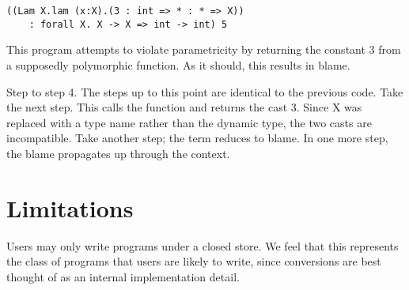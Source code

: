 \documentclass[11pt,numbers,nocopyrightspace,acmlarge,anonymous]{acmart}
\begin{document}
\begin{lstlisting}
((Lam X.lam (x:X).(3 : int => * : * => X)) 
	: forall X. X -> X => int -> int) 5
\end{lstlisting}

This program attempts to violate parametricity by returning the constant 3
from a supposedly polymorphic function. As it should, this results in blame.

Step to step 4. The steps up to this point are identical to the previous code.
Take the next step. This calls the function and returns the cast 3.
Since X was replaced with a type name rather than the dynamic type,
the two casts are incompatible. Take another step; the term reduces to blame.
In one more step, the blame propagates up through the context.


\section{Limitations}
Users may only write programs under a closed store.
We feel that this represents the class of programs
that users are likely to write, since conversions
are best thought of as an internal implementation detail.
\end{document}
